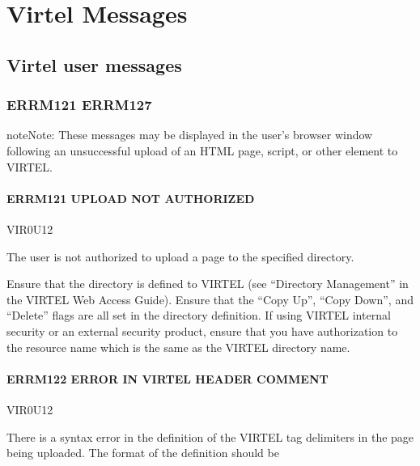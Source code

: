 \documentclass[letterpaper,10pt,english]{sphinxmanual}
\begin{document}
\chapter{Virtel Messages}
\label{\detokenize{messages:virtel-messages}}\label{\detokenize{messages:v461mg-introduction}}

\section{Virtel user messages}
\label{\detokenize{messages:virtel-user-messages}}

\subsection{ERRM121 \sphinxhyphen{} ERRM127}
\label{\detokenize{messages:errm121-errm127}}
\begin{sphinxadmonition}{note}{Note:}
\sphinxAtStartPar
These messages may be displayed in the user’s browser window following an unsuccessful upload of an HTML page, script, or other element to VIRTEL.
\end{sphinxadmonition}


\subsubsection{ERRM121 \sphinxhyphen{}UPLOAD NOT AUTHORIZED}
\label{\detokenize{messages:errm121-upload-not-authorized}}\begin{description}
\sphinxAtStartPar
VIR0U12

\sphinxAtStartPar
The user is not authorized to upload a page to the specified directory.

\sphinxAtStartPar
Ensure that the directory is defined to VIRTEL (see “Directory Management” in the VIRTEL Web Access Guide). Ensure that the “Copy Up”, “Copy Down”, and “Delete” flags are all set in the directory definition. If using VIRTEL internal security or an external security product, ensure that you have authorization to the resource name which is the same as the VIRTEL directory name.

\end{description}


\subsubsection{ERRM122 \sphinxhyphen{} ERROR IN VIRTEL HEADER COMMENT}
\label{\detokenize{messages:errm122-error-in-virtel-header-comment}}\begin{description}
\sphinxAtStartPar
VIR0U12

\sphinxAtStartPar
There is a syntax error in the definition of the VIRTEL tag delimiters in the page being uploaded. The format of the definition should be

\end{description}
\end{document}
